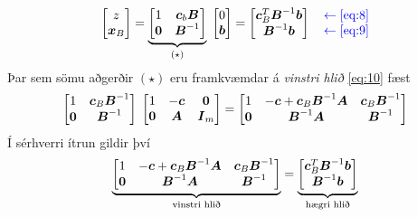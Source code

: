 \begin{equation}
 \begin{bmatrix}  z \\ \vec{x}_B \end{bmatrix}=\underbrace{\begin{bmatrix} 1 & \vec{c}_b\mat{B} \\ \vec{0} & \mat{B}^{-1}\end{bmatrix}}_{(\star)}\;\begin{bmatrix}0\\\vec{b}\end{bmatrix}=\begin{bmatrix} \vec{c}_B^T\mat{B}^{-1}\vec{b} \\ \mat{B}^{-1}\vec{b}\end{bmatrix}\quad\color{blue}{\begin{matrix} \leftarrow\eqref{eq:8} \\ \leftarrow\eqref{eq:9}\end{matrix}}
\end{equation}
Þar sem sömu aðgerðir $(\star)$ eru framkvæmdar á \emph{vinstri hlið} \eqref{eq:10} fæst
\begin{equation}
 \begin{bmatrix}1 & \vec{c}_B\mat{B}^{-1} \\ \vec{0} & \mat{B}^{-1} \end{bmatrix}\;\begin{bmatrix} 1 & -\vec{c} & \vec{0}  \\ \vec{0} & \mat{A} & \mat{I}_m \end{bmatrix} = \begin{bmatrix} 1 & -\vec{c}+\vec{c}_B\mat{B}^{-1}\mat{A}  & \vec{c}_B\mat{B}^{-1} \\ \vec{0} & \mat{B}^{-1}\mat{A} & \mat{B}^{-1}\end{bmatrix}
\end{equation}
Í sérhverri ítrun gildir því 
\begin{equation}
 \underbrace{\begin{bmatrix} 1 & -\vec{c}+\vec{c}_B\mat{B}^{-1}\mat{A}  & \vec{c}_B\mat{B}^{-1} \\ \vec{0} & \mat{B}^{-1}\mat{A} & \mat{B}^{-1}\end{bmatrix} }_{\textrm{vinstri hlið}}
 =\underbrace{\begin{bmatrix} \vec{c}_B^T\mat{B}^{-1}\vec{b} \\ \mat{B}^{-1}\vec{b}\end{bmatrix}}_{\textrm{hægri hlið}}
\end{equation}

